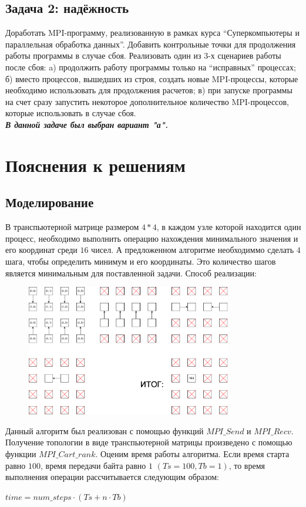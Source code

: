 \documentclass[a4paper]{article}
\begin{document}
\subsection{Задача 2: надёжность}
Доработать MPI-программу, реализованную в рамках курса “Суперкомпьютеры и параллельная обработка данных”. Добавить контрольные точки для продолжения работы программы в случае сбоя. Реализовать один из 3-х сценариев работы после сбоя: a) продолжить работу программы только на “исправных” процессах; б) вместо процессов, вышедших из строя, создать новые MPI-процессы, которые необходимо использовать для продолжения расчетов; в) при запуске программы на счет сразу запустить некоторое дополнительное количество MPI-процессов, которые использовать в случае сбоя.\\
\textit{\textbf{В данной задаче был выбран вариант "а".}}
\newpage

\section{Пояснения к решениям}
\subsection{Моделирование}
В транспьютерной матрице размером $4*4$, в каждом узле которой находится один процесс, необходимо выполнить операцию нахождения минимального значения и его координат среди $16$ чисел. 
А предложенном алгоритме необходиммо сделать  $4$ шага, чтобы определить минимум и его координаты. Это количество шагов является минимальным для поставленной задачи. Способ реализации:

\begin{figure}[htbp]
  \centering
  \includegraphics[width=0.8\textwidth]{graph}
\end{figure}

Данный алгоритм был реализован с помощью функций $MPI\_Send$ и $MPI\_Recv$. Получение топологии в виде транспьютерной матрицы произведено с помощью функции
$MPI\_Cart\_rank$.
Оценим время работы алгоритма. Если время старта равно $100$, время передачи байта равно $1$ $(Ts=100,Tb=1)$, то время выполнения операции рассчитывается следующим
образом:
\begin{center}
$time = num\_steps · (T s + n · T b)$
\end{center}
\end{document}
